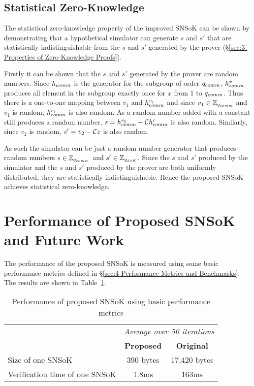 \subsection{Statistical Zero-Knowledge}
The statistical zero-knowledge property of the improved SNSoK can be shown by demonstrating that a hypothetical simulator can generate $s$ and $s'$ that are statistically indistinguishable from the $s$ and $s'$ generated by the prover (\S\ref{sec:3-Properties of Zero-Knowledge Proofs}). 

Firstly it can be shown that the $s$ and $s'$ generated by the prover are random numbers. Since $h_{comm}$ is the generator for the subgroup of order $q_{comm}$, $h_{comm}^{x}$ produces all element in the subgroup exactly once for $x$ from 1 to $q_{comm}$. Thus there is a one-to-one mapping between $v_1$ and $h_{comm}^{v_1}$ and since $v_1\in\mathbb{Z}_{q_{comm}}$ and $v_1$ is random, $h_{comm}^{v_1}$ is also random. As a random number added with a constant still produces a random number, $s=h_{comm}^{v_1}-\mathcal{C}h_{comm}^{r}$ is also random. Similarly, since $v_2$ is random, $s'=v_2-\mathcal{C} z$ is also random. 

As such the simulator can be just a random number generator that produces random numbers $s\in\mathbb{Z}_{q_{comm}}$ and $s'\in\mathbb{Z}_{q_{SoK}}$. Since the $s$ and $s'$ produced by the simulator and the $s$ and $s'$ produced by the prover are both uniformly distributed, they are statistically indistinguishable. Hence the proposed SNSoK achieves statistical zero-knowledge.

\section{Performance of Proposed SNSoK and Future Work}
\label{sec:5-Performance of Proposed SNSoK and Future Work}
The performance of the proposed SNSoK is measured using some basic performance metrics defined in \S\ref{sec:4-Performance Metrics and Benchmarks}. The results are shown in Table~\ref{tab:SNSoK_improvement_performance}.

\begin{table}[H]
	\centering
	\begin{tabular}{ l | c | c }
		\multirow{2}{*}{} & \multicolumn{2}{c}{\textit{Average over 50 iterations}} \\
		& \textbf{Proposed} & \textbf{Original} \\ 		
		\hline 
		\hline
		Size of one SNSoK & 390 bytes & 17,420 bytes \\
		\hline
		Verification time of one SNSoK & 1.8ms & 163ms \\
		\hline
	\end{tabular}
	\caption{Performance of proposed SNSoK using basic performance metrics}
	\label{tab:SNSoK_improvement_performance}
\end{table}

